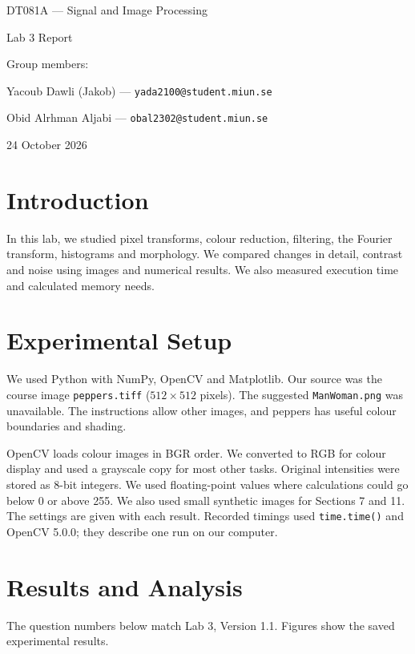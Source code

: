 \documentclass[11pt,a4paper]{article}
\begin{document}
\begin{center}
{\Large DT081A --- Signal and Image Processing\par}
\vspace{3pt}
{\Large Lab 3 Report\par}
\vspace{5pt}
Group members:\par
Yacoub Dawli (Jakob) --- \texttt{yada2100@student.miun.se}\par
Obid Alrhman Aljabi --- \texttt{obal2302@student.miun.se}\par
24 October 2026\par
\end{center}
\vspace{-3pt}

\section{Introduction}
In this lab, we studied pixel transforms, colour reduction, filtering, the Fourier transform, histograms and morphology. We compared changes in detail, contrast and noise using images and numerical results. We also measured execution time and calculated memory needs.

\section{Experimental Setup}
We used Python with NumPy, OpenCV and Matplotlib. Our source was the course image \texttt{peppers.tiff} ($512\times512$ pixels). The suggested \texttt{ManWoman.png} was unavailable. The instructions allow other images, and peppers has useful colour boundaries and shading.

OpenCV loads colour images in BGR order. We converted to RGB for colour display and used a grayscale copy for most other tasks. Original intensities were stored as 8-bit integers. We used floating-point values where calculations could go below 0 or above 255. We also used small synthetic images for Sections 7 and 11. The settings are given with each result. Recorded timings used \texttt{time.time()} and OpenCV 5.0.0; they describe one run on our computer.

\section{Results and Analysis}
The question numbers below match Lab 3, Version 1.1. Figures show the saved experimental results.
\end{document}
